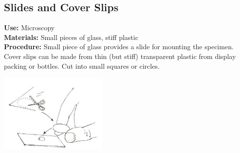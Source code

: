 \begin{multicols}{2}
\section{Slides and Cover Slips}
\label{sec:slide-cover-slip}
\vspace{-10pt}
\textbf{Use:} Microscopy\\
\textbf{Materials:} Small pieces of glass, stiff plastic\\
\textbf{Procedure:} Small piece of glass provides a slide for mounting the
specimen. Cover slips can be made
from thin (but stiff) transparent plastic from
display packing or bottles. Cut into small squares or circles.
\begin{center}
\includegraphics[width=0.4\textwidth]{./img/source/slide-cover-slip.jpg}
\end{center}


\columnbreak


\end{multicols}
